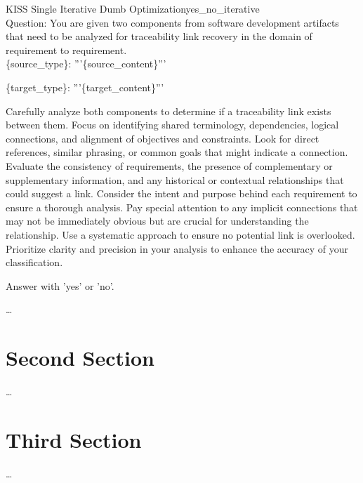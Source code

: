 \begin{prompt}{KISS Single Iterative Dumb Optimization}{yes_no_iterative}\\
    Question: You are given two components from software development artifacts that need to be analyzed for traceability link recovery in the domain of requirement to requirement.\\
    
    \{source\_type\}: '''\{source\_content\}'''

    \{target\_type\}: '''\{target\_content\}'''

    Carefully analyze both components to determine if a traceability link exists between them. Focus on identifying shared terminology, dependencies, logical connections, and alignment of objectives and constraints. Look for direct references, similar phrasing, or common goals that might indicate a connection. Evaluate the consistency of requirements, the presence of complementary or supplementary information, and any historical or contextual relationships that could suggest a link. Consider the intent and purpose behind each requirement to ensure a thorough analysis. Pay special attention to any implicit connections that may not be immediately obvious but are crucial for understanding the relationship. Use a systematic approach to ensure no potential link is overlooked. Prioritize clarity and precision in your analysis to enhance the accuracy of your classification.

    Answer with 'yes' or 'no'.
    
\end{prompt}

\begin{landscape}

\end{landscape}







\dots

\section{Second Section}
\label{sec:Evaluation:SecondSection}

\dots

\section{Third Section}
\label{sec:Evaluation:ThirdSection}

\dots
